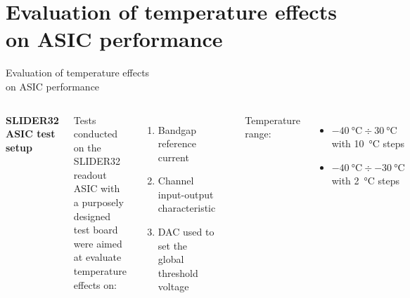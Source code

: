 \documentclass[aspectratio=169,xcolor=dvipsnames]{beamer}
\begin{document}

\section{Evaluation of temperature effects on ASIC performance}

\begin{frame}{\vspace{-0.3cm} Evaluation of temperature effects \\ \vskip-0.15cm on ASIC performance}
\fontsize{8.5pt}{1}\selectfont
    \begin{columns}[T]
        \vskip0.3cm
        \textbf{SLIDER32 ASIC test setup}\\
        \vskip0.15cm
        
        Tests conducted on the SLIDER32 readout ASIC with a purposely designed test board were aimed at evaluate temperature effects on:
        \begin{enumerate}
            \item Bandgap reference current
            \item Channel input-output characteristic
            \item DAC used to set the global threshold voltage
        \end{enumerate}

        \vskip0.05cm
        \includegraphics[width=0.95\textwidth]{images/temperature_effects/test_setup_test_board_csavrefgm_530mv.png}
        \vskip0.2cm

        Temperature range: 
        \begin{itemize}
            \item $\SI{-40}{\celsius} \div \SI{30}{\celsius}$ with \SI{10}{\celsius} steps
            \item $\SI{-40}{\celsius} \div \SI{-30}{\celsius}$ with \SI{2}{\celsius} steps
        \end{itemize}
 

\end{columns}
\end{frame}
\end{document}
